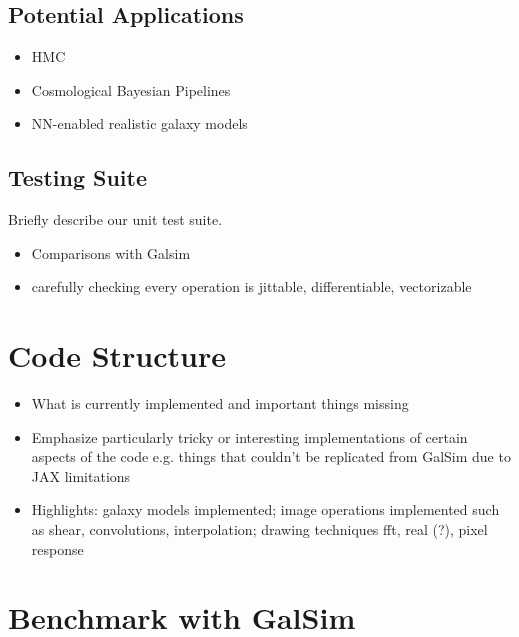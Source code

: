 \documentclass[twocolumn,twocolappendix]{openjournal}
\begin{document}
\subsection{Potential Applications}

\begin{itemize}
    \item HMC 
    \item Cosmological Bayesian Pipelines
    \item NN-enabled realistic galaxy models
\end{itemize}

\subsection{Testing Suite}

Briefly describe our unit test suite. 

\begin{itemize}
    \item Comparisons with Galsim
    \item carefully checking every operation is jittable, differentiable, vectorizable
\end{itemize}

\section{Code Structure} %

\begin{itemize}
    \item What is currently implemented and important things missing
    
    \item Emphasize particularly tricky or interesting implementations of certain aspects of the code e.g. things that couldn't be replicated from GalSim due to JAX limitations
    
    \item Highlights: galaxy models implemented; image operations implemented such as shear, convolutions, interpolation; drawing techniques fft, real (?), pixel response 
\end{itemize}


\section{Benchmark with GalSim} 
\end{document}
